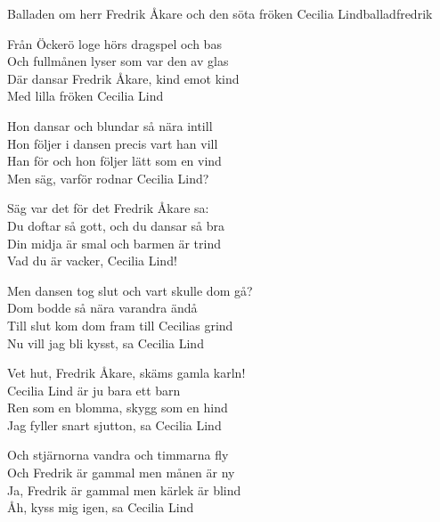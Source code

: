 \begin{song}{Balladen om herr Fredrik Åkare och den söta fröken Cecilia Lind}{balladfredrik}
\begin{vers}
Från Öckerö loge hörs dragspel och bas\\
Och fullmånen lyser som var den av glas\\
Där dansar Fredrik Åkare, kind emot kind\\
Med lilla fröken Cecilia Lind\\
\end{vers}
\begin{vers}
Hon dansar och blundar så nära intill\\
Hon följer i dansen precis vart han vill\\
Han för och hon följer lätt som en vind\\
Men säg, varför rodnar Cecilia Lind?\\
\end{vers}
\begin{vers}
Säg var det för det Fredrik Åkare sa:\\
Du doftar så gott, och du dansar så bra\\
Din midja är smal och barmen är trind\\
Vad du är vacker, Cecilia Lind!\\
\end{vers}
\begin{vers}
Men dansen tog slut och vart skulle dom gå?\\
Dom bodde så nära varandra ändå\\
Till slut kom dom fram till Cecilias grind\\
Nu vill jag bli kysst, sa Cecilia Lind\\
\end{vers}

\newp

\begin{vers}
Vet hut, Fredrik Åkare, skäms gamla karln!\\
Cecilia Lind är ju bara ett barn\\
Ren som en blomma, skygg som en hind\\
Jag fyller snart sjutton, sa Cecilia Lind\\
\end{vers}

\begin{vers}
Och stjärnorna vandra och timmarna fly\\
Och Fredrik är gammal men månen är ny\\
Ja, Fredrik är gammal men kärlek är blind\\
Åh, kyss mig igen, sa Cecilia Lind\\
\end{vers}
\end{song}
